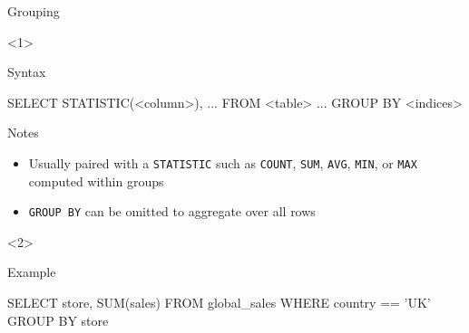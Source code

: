 \begin{frame}[t,fragile]{Grouping}
    \begin{onlyenv}<1>
        \begin{block}{Syntax}
            \begin{sql}
                SELECT STATISTIC(<column>), ...
                FROM <table>
                ...
                GROUP BY <indices>
            \end{sql}
        \end{block}
        \vfill
        \begin{block}{Notes}
            \begin{itemize}
                \item Usually paired with a \texttt{STATISTIC} such as
                      \texttt{COUNT}, \texttt{SUM},
                      \texttt{AVG}, \texttt{MIN},
                      or \texttt{MAX} computed within groups
                \item \texttt{GROUP BY} can be omitted to aggregate
                      over \alert{all rows}
            \end{itemize}
        \end{block}
    \end{onlyenv}
    \begin{onlyenv}<2>
        \begin{block}{Example}
            \begin{sql}
                SELECT store, SUM(sales)
                FROM global_sales
                WHERE country == 'UK'
                GROUP BY store
            \end{sql}
        \end{block}
    \end{onlyenv}
\end{frame}

